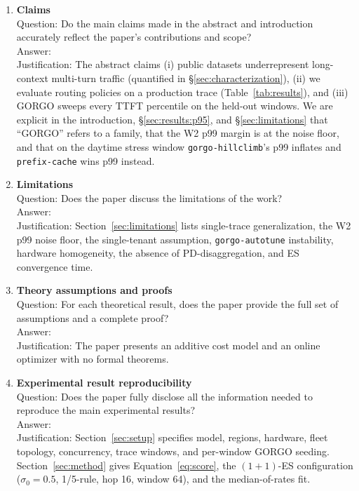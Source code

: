 \documentclass{article}
\begin{document}
\begin{enumerate}

\item {\bf Claims}\\
Question: Do the main claims made in the abstract and introduction accurately reflect the paper's contributions and scope?\\
Answer: \answerYes{}\\
Justification: The abstract claims (i) public datasets underrepresent long-context multi-turn traffic (quantified in \S\ref{sec:characterization}), (ii) we evaluate routing policies on a production trace (Table~\ref{tab:results}), and (iii) GORGO sweeps every TTFT percentile on the held-out windows. We are explicit in the introduction, \S\ref{sec:results:p95}, and \S\ref{sec:limitations} that ``GORGO'' refers to a family, that the W2 p99 margin is at the noise floor, and that on the daytime stress window \texttt{gorgo-hillclimb}'s p99 inflates and \texttt{prefix-cache} wins p99 instead.

\item {\bf Limitations}\\
Question: Does the paper discuss the limitations of the work?\\
Answer: \answerYes{}\\
Justification: Section~\ref{sec:limitations} lists single-trace generalization, the W2 p99 noise floor, the single-tenant assumption, \texttt{gorgo-autotune} instability, hardware homogeneity, the absence of PD-disaggregation, and ES convergence time.

\item {\bf Theory assumptions and proofs}\\
Question: For each theoretical result, does the paper provide the full set of assumptions and a complete proof?\\
Answer: \answerNA{}\\
Justification: The paper presents an additive cost model and an online optimizer with no formal theorems.

\item {\bf Experimental result reproducibility}\\
Question: Does the paper fully disclose all the information needed to reproduce the main experimental results?\\
Answer: \answerYes{}\\
Justification: Section~\ref{sec:setup} specifies model, regions, hardware, fleet topology, concurrency, trace windows, and per-window GORGO seeding. Section~\ref{sec:method} gives Equation~\ref{eq:score}, the $(1{+}1)$-ES configuration ($\sigma_0=0.5$, 1/5-rule, hop 16, window 64), and the median-of-rates fit. 


\end{enumerate}
\end{document}
